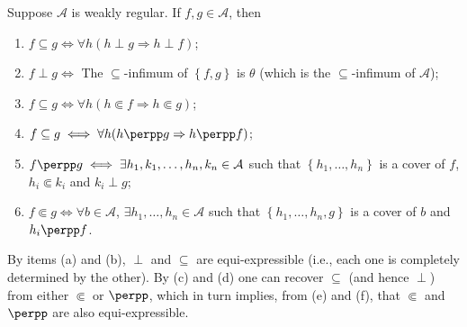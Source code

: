 \begin{theorem}\label{theoremrelationsrelations}
Suppose $\mathcal{A}$ is weakly regular. If $f,g\in\mathcal{A}$, then
\begin{enumerate}
\item[(a)] $f\subseteq g\iff\forall h(h\perp g\Rightarrow h\perp f)$;
\item[(b)] $f\perp g\iff$ The $\subseteq$-infimum of $\left\{f,g\right\}$ is $\theta$ (which is the $\subseteq$-infimum of $\mathcal{A}$);
\item[(c)] $f\subseteq g\iff\forall h(h\Subset f\Rightarrow h\Subset g)$;
\item[(d)] $f\subseteq g\iff\forall h(h\perpp g\Rightarrow h\perpp f)$;
\item[(e)] $f\perpp g\iff\exists h_1,k_1,\ldots,h_n,k_n\in\mathcal{A}$ such that $\left\{h_1,\ldots,h_n\right\}$ is a cover of $f$, $h_i\Subset k_i$ and $k_i\perp g$;
\item[(f)] $f\Subset g\iff\forall b\in\mathcal{A}$, $\exists h_1,\ldots,h_n\in\mathcal{A}$ such that $\left\{h_1,\ldots,h_n,g\right\}$ is a cover of $b$ and $h_i\perpp f$.
\end{enumerate}
By items (a) and (b), $\perp$ and $\subseteq$ are equi-expressible (i.e., each one is completely determined by the other). By (c) and (d) one can recover $\subseteq$ (and hence $\perp$) from either $\Subset$ or $\perpp$, which in turn implies, from (e) and (f), that $\Subset$ and $\perpp$ are also equi-expressible.
\end{theorem}
